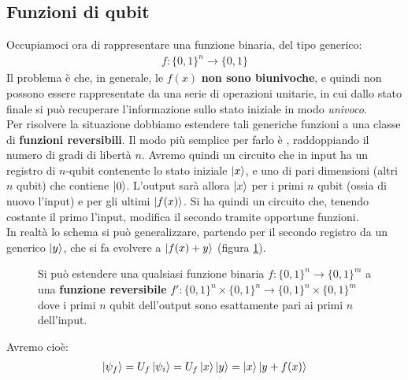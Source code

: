 \documentclass[../../InformazioneQuantistica.tex]{subfiles}
\begin{document}
\subsection{Funzioni di qubit}
Occupiamoci ora di rappresentare una funzione binaria, del tipo generico:
\begin{align*}
f: \{0,1\}^n \to \{0,1\}
\end{align*}
Il problema è che, in generale, le $f(x)$ \textbf{non sono biunivoche}, e quindi non possono essere rappresentate da una serie di operazioni unitarie, in cui dallo stato finale si può recuperare l'informazione sullo stato iniziale in modo \textit{univoco}.\\
Per risolvere la situazione dobbiamo estendere tali generiche funzioni a una classe di \textbf{funzioni reversibili}. Il modo più semplice per farlo è , raddoppiando il numero di gradi di libertà $n$. Avremo quindi un circuito che in input ha un registro di $n$-qubit contenente lo stato iniziale $\Ket{x}$, e uno di pari dimensioni (altri $n$ qubit) che contiene $\Ket{0}$. L'output sarà allora $\Ket{x}$ per i primi $n$ qubit (ossia di nuovo l'input) e per gli ultimi $\Ket{f(x)}$. Si ha quindi un circuito che, tenendo costante il primo l'input, modifica il secondo tramite opportune funzioni.\\
In realtà lo schema si può generalizzare, partendo per il secondo registro da un generico $\Ket{y}$, che si fa evolvere a $\Ket{f(x) + y}$ (figura \ref{fig:computazione-reversibile}).

\begin{figure}[H]
\centering

\caption{Si può estendere una qualsiasi funzione binaria $f:\{0,1\}^n \to \{0,1\}^m$ a una \textbf{funzione reversibile} $f':\{0,1\}^n \times \{0,1\}^n \to \{0,1\}^n \times \{0,1\}^m$ dove i primi $n$ qubit dell'output sono esattamente pari ai primi $n$ dell'input.\label{fig:computazione-reversibile}}
\end{figure}

Avremo cioè:
\begin{align*}
\Ket{\psi_f} = U_f\Ket{\psi_i} = U_f \Ket{x}\Ket{y} = \Ket{x}\Ket{y + f(x)}
\end{align*}
\end{document}
